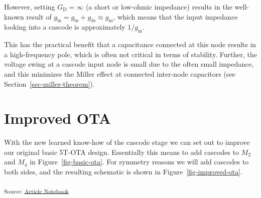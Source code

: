 \documentclass[
  a4paper,
  DIV=11,
  numbers=noendperiod]{scrartcl}
\begin{document}
However, setting \(G_\mathrm{D} = \infty\) (a short or low-ohmic
impedance) results in the well-known result of
\(g_\mathrm{in} = g_\mathrm{m}+ g_\mathrm{ds}\approx g_\mathrm{m}\),
which means that the input impedance looking into a cascode is
approximately \(1/g_\mathrm{m}\).

\begin{tcolorbox}[enhanced jigsaw, titlerule=0mm, left=2mm, coltitle=black, toprule=.15mm, breakable, opacitybacktitle=0.6, colframe=quarto-callout-important-color-frame, bottomtitle=1mm, toptitle=1mm, opacityback=0, colbacktitle=quarto-callout-important-color!10!white, title=\textcolor{quarto-callout-important-color}{\faExclamation}\hspace{0.5em}{Benefit of Cascode (Input)}, arc=.35mm, rightrule=.15mm, colback=white, bottomrule=.15mm, leftrule=.75mm]

This has the practical benefit that a capacitance connected at this node
results in a high-frequency pole, which is often not critical in terms
of stability. Further, the voltage swing at a cascode input node is
small due to the often small impedance, and this minimizes the Miller
effect at connected inter-node capacitors (see
Section~\ref{sec-miller-theorem}).

\end{tcolorbox}

\section{Improved OTA}\label{sec-improved-ota}

With the new learned know-how of the cascode stage we can set out to
improve our original basic 5T-OTA design. Essentially this means to add
cascodes to \(M_2\) and \(M_4\) in Figure~\ref{fig-basic-ota}. For
symmetry reasons we will add cascodes to both sides, and the resulting
schematic is shown in Figure~\ref{fig-improved-ota}.

\textsubscript{Source:
\href{https://iic-jku.github.io/analog-circuit-design/index.qmd.html}{Article
Notebook}}
\end{document}
